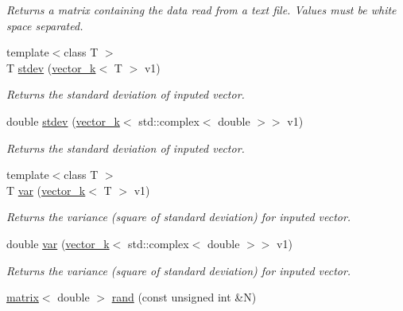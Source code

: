 \begin{DoxyCompactItemize}
\begin{DoxyCompactList}\small\item\em Returns a matrix containing the data read from a text file. Values must be white space separated. \end{DoxyCompactList}\item 
\hypertarget{namespacekeycpp_a61234b7bb0f3126b3db82634675c2951}{{\footnotesize template$<$class T $>$ }\\T \hyperlink{namespacekeycpp_a61234b7bb0f3126b3db82634675c2951}{stdev} (\hyperlink{classkeycpp_1_1vector__k}{vector\-\_\-k}$<$ T $>$ v1)}\label{namespacekeycpp_a61234b7bb0f3126b3db82634675c2951}

\begin{DoxyCompactList}\small\item\em Returns the standard deviation of inputed vector. \end{DoxyCompactList}\item 
\hypertarget{namespacekeycpp_abdec07a4c4dd0fc5de230a753bf59066}{double \hyperlink{namespacekeycpp_abdec07a4c4dd0fc5de230a753bf59066}{stdev} (\hyperlink{classkeycpp_1_1vector__k}{vector\-\_\-k}$<$ std\-::complex$<$ double $>$$>$ v1)}\label{namespacekeycpp_abdec07a4c4dd0fc5de230a753bf59066}

\begin{DoxyCompactList}\small\item\em Returns the standard deviation of inputed vector. \end{DoxyCompactList}\item 
\hypertarget{namespacekeycpp_a553528cf7a020895037ce3b1a828a04c}{{\footnotesize template$<$class T $>$ }\\T \hyperlink{namespacekeycpp_a553528cf7a020895037ce3b1a828a04c}{var} (\hyperlink{classkeycpp_1_1vector__k}{vector\-\_\-k}$<$ T $>$ v1)}\label{namespacekeycpp_a553528cf7a020895037ce3b1a828a04c}

\begin{DoxyCompactList}\small\item\em Returns the variance (square of standard deviation) for inputed vector. \end{DoxyCompactList}\item 
\hypertarget{namespacekeycpp_af3249effde70a573fbd8881dc4629e04}{double \hyperlink{namespacekeycpp_af3249effde70a573fbd8881dc4629e04}{var} (\hyperlink{classkeycpp_1_1vector__k}{vector\-\_\-k}$<$ std\-::complex$<$ double $>$$>$ v1)}\label{namespacekeycpp_af3249effde70a573fbd8881dc4629e04}

\begin{DoxyCompactList}\small\item\em Returns the variance (square of standard deviation) for inputed vector. \end{DoxyCompactList}\item 
\hypertarget{namespacekeycpp_ab99a9561cf5654ae722a0879b41d9d73}{\hyperlink{classkeycpp_1_1matrix}{matrix}$<$ double $>$ \hyperlink{namespacekeycpp_ab99a9561cf5654ae722a0879b41d9d73}{rand} (const unsigned int \&N)}\label{namespacekeycpp_ab99a9561cf5654ae722a0879b41d9d73}


\end{DoxyCompactItemize}
